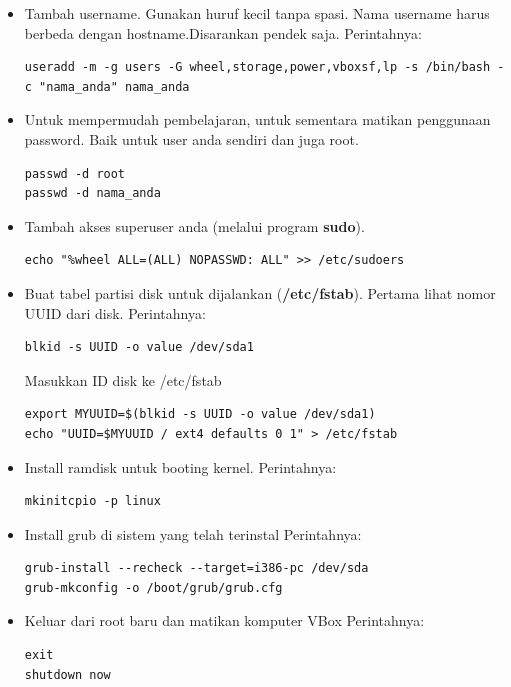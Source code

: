 \documentclass[12pt,]{article}
\begin{document}
\begin{itemize}
		\item Tambah username. Gunakan huruf kecil tanpa spasi.
		Nama username harus berbeda dengan hostname.Disarankan pendek saja.
		Perintahnya:
		\begin{verbatim}
useradd -m -g users -G wheel,storage,power,vboxsf,lp -s /bin/bash -c "nama_anda" nama_anda

		\end{verbatim}
		
		\item Untuk mempermudah pembelajaran, untuk sementara matikan penggunaan password.
		Baik untuk user anda sendiri dan juga root.
		\begin{verbatim}
passwd -d root
passwd -d nama_anda
		\end{verbatim}
		
		\item Tambah akses superuser anda (melalui program \textbf{sudo}).
		\begin{verbatim}
echo "%wheel ALL=(ALL) NOPASSWD: ALL" >> /etc/sudoers
		\end{verbatim}
		
		\item Buat tabel partisi disk untuk dijalankan (\textbf{/etc/fstab}).
		Pertama lihat nomor UUID dari disk. Perintahnya:
		\begin{verbatim}
blkid -s UUID -o value /dev/sda1
		\end{verbatim}
		Masukkan ID disk ke /etc/fstab
		\begin{verbatim}
export MYUUID=$(blkid -s UUID -o value /dev/sda1)
echo "UUID=$MYUUID / ext4 defaults 0 1" > /etc/fstab
		\end{verbatim}
		
		\item Install ramdisk untuk booting kernel.
		Perintahnya:
		\begin{verbatim}
mkinitcpio -p linux
		\end{verbatim}
		
		\item Install grub di sistem yang telah terinstal
		Perintahnya:
		\begin{verbatim}
grub-install --recheck --target=i386-pc /dev/sda
grub-mkconfig -o /boot/grub/grub.cfg
		\end{verbatim}
		
		\item Keluar dari root baru dan matikan komputer VBox
		Perintahnya:
		\begin{verbatim}
exit
shutdown now
		\end{verbatim}
	
	\end{itemize}
	
\end{document}
